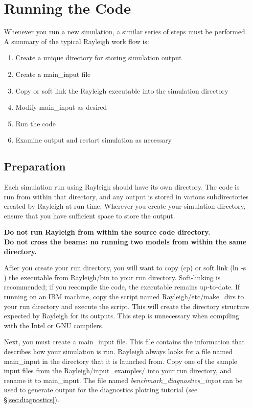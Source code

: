 \clearpage
\section{Running the Code}
Whenever you run a new simulation, a similar series of steps must be performed.  A summary of the typical Rayleigh work flow is:
\begin{enumerate}
\item Create a unique directory for storing simulation output
\item Create a main\_input file
\item Copy or soft link the Rayleigh executable into the simulation directory
\item Modify main\_input as desired
\item Run the code
\item Examine output and restart simulation as necessary
\end{enumerate}

\subsection{Preparation}
Each simulation run using Rayleigh should have its own directory.  The code is run from within that directory, and any output is stored in various subdirectories created by Rayleigh at run time.  Wherever you create your simulation directory, ensure that you have sufficient space to store the output.

\textbf{Do not run Rayleigh from within the source code directory.
\\
Do not cross the beams: no running two models from within the same directory.}

After you create your run directory, you will want to copy (cp) or soft link (ln -s ) the executable from Rayleigh/bin to your run directory.  Soft-linking is recommended; if you recompile the code, the executable remains up-to-date.  If running on an IBM machine, copy the script named Rayleigh/etc/make\_dirs to your run directory and execute the script.  This will create the directory structure expected by Rayleigh for its outputs.  This step is unnecessary when compiling with the Intel or GNU compilers.

Next, you must create a main\_input file.  This file contains the information that describes how your simulation is run.  Rayleigh always looks for a file named main\_input in the directory that it is launched from.  Copy one of the sample input files from the Rayleigh/input\_examples/ into your run directory, and rename it to main\_input.  The file named \textit{benchmark\_diagnostics\_input} can be used to generate output for the diagnostics plotting tutorial (see \S \ref{sec:diagnostics}). 

